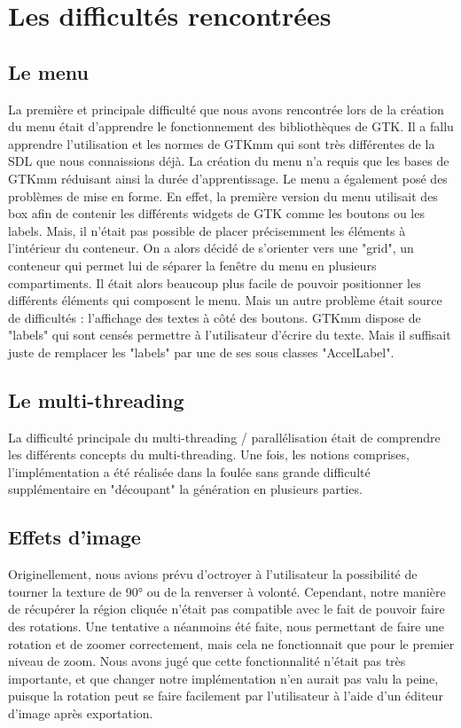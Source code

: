 \documentclass{article}
\begin{document}
	\section{Les difficultés rencontrées}

	\subsection{Le menu}

	La première et principale difficulté que nous avons rencontrée lors de la création du menu était d'apprendre le fonctionnement des bibliothèques de GTK. Il a fallu apprendre l'utilisation et les normes de GTKmm qui sont très différentes de la SDL que nous connaissions déjà.
	La création du menu n'a requis que les bases de GTKmm réduisant ainsi la durée d'apprentissage.
	Le menu a également posé des problèmes de mise en forme.
	En effet, la première version du menu utilisait des box afin de contenir les différents widgets de GTK comme les boutons ou les labels.
	Mais, il n'était pas possible de placer précisemment les éléments à l'intérieur du conteneur.
	On a alors décidé de s'orienter vers une "grid", un conteneur qui permet lui de séparer la fenêtre du menu en plusieurs compartiments.
	Il était alors beaucoup plus facile de pouvoir positionner les différents éléments qui composent le menu.
	Mais un autre problème était source de difficultés : l'affichage des textes à côté des boutons.
	GTKmm dispose de "labels" qui sont censés permettre à l'utilisateur d'écrire du texte.
	Mais il suffisait juste de remplacer les "labels" par une de ses sous classes "AccelLabel".

	\subsection{Le multi-threading}

	La difficulté principale du multi-threading / parallélisation était de comprendre les différents concepts du multi-threading.
	Une fois, les notions comprises, l'implémentation a été réalisée dans la foulée sans grande difficulté supplémentaire en "découpant" la génération en plusieurs parties.

	\subsection{Effets d'image}

	Originellement, nous avions prévu d'octroyer à l'utilisateur la possibilité de tourner la texture de 90° ou de la renverser à volonté.
	Cependant, notre manière de récupérer la région cliquée n'était pas compatible avec le fait de pouvoir faire des rotations.
	Une tentative a néanmoins été faite, nous permettant de faire une rotation et de zoomer correctement, mais cela ne fonctionnait que pour le premier niveau de zoom.
	Nous avons jugé que cette fonctionnalité n'était pas très importante, et que changer notre implémentation n'en aurait pas valu la peine, puisque la rotation peut se faire facilement par l'utilisateur à l'aide d'un éditeur d'image après exportation.
\end{document}
